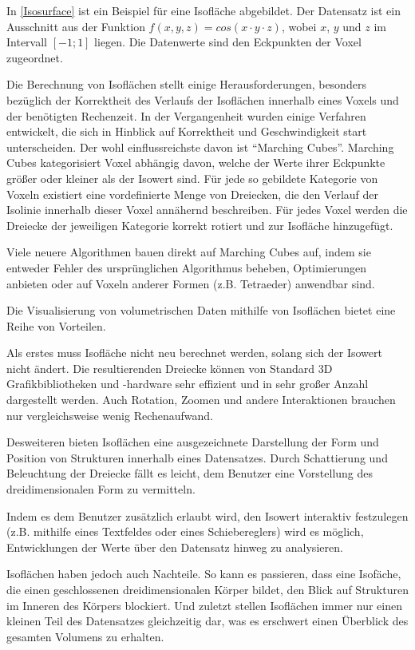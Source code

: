 \documentclass[a4paper,fontsize=12pt,toc=bib,halfparskip,ngerman]{scrartcl}
\begin{document}
In \cref{Isosurface} ist ein Beispiel f\"ur eine Isofl\"ache abgebildet. Der Datensatz ist ein Ausschnitt aus der Funktion $f(x,y,z) = cos(x \cdot y \cdot z)$, wobei $x$, $y$ und $z$ im Intervall $[-1;1]$ liegen. Die Datenwerte sind den Eckpunkten der Voxel zugeordnet. 

Die Berechnung von Isofl\"achen stellt einige Herausforderungen, besonders bez\"uglich der Korrektheit des Verlaufs der Isofl\"achen innerhalb eines Voxels und der ben\"otigten Rechenzeit. In der Vergangenheit wurden einige Verfahren entwickelt, die sich in Hinblick auf Korrektheit und Geschwindigkeit start unterscheiden. Der wohl einflussreichste davon ist ``Marching Cubes''. Marching Cubes kategorisiert Voxel abh\"angig davon, welche der Werte ihrer Eckpunkte gr\"o{\ss}er oder kleiner als der Isowert sind. F\"ur jede so gebildete Kategorie von Voxeln existiert eine vordefinierte Menge von Dreiecken, die den Verlauf der Isolinie innerhalb dieser Voxel ann\"ahernd beschreiben. F\"ur jedes Voxel werden die Dreiecke der jeweiligen Kategorie korrekt rotiert und zur Isofl\"ache hinzugef\"ugt.

Viele neuere Algorithmen bauen direkt auf Marching Cubes auf, indem sie entweder Fehler des urspr\"unglichen Algorithmus beheben, Optimierungen anbieten oder auf Voxeln anderer Formen (z.B. Tetraeder) anwendbar sind.

Die Visualisierung von volumetrischen Daten mithilfe von Isofl\"achen bietet eine Reihe von Vorteilen. 

Als erstes muss Isofl\"ache nicht neu berechnet werden, solang sich der Isowert nicht \"andert. Die resultierenden Dreiecke k\"onnen von Standard 3D Grafikbibliotheken und -hardware sehr effizient und in sehr gro{\ss}er Anzahl dargestellt werden. Auch Rotation, Zoomen und andere Interaktionen brauchen nur vergleichsweise wenig Rechenaufwand.

Desweiteren bieten Isofl\"achen eine ausgezeichnete Darstellung der Form und Position von Strukturen innerhalb eines Datensatzes. Durch Schattierung und Beleuchtung der Dreiecke f\"allt es leicht, dem Benutzer eine Vorstellung des dreidimensionalen Form zu vermitteln.

Indem es dem Benutzer zus\"atzlich erlaubt wird, den Isowert interaktiv festzulegen (z.B. mithilfe eines Textfeldes oder eines Schiebereglers) wird es m\"oglich, Entwicklungen der Werte \"uber den Datensatz hinweg zu analysieren.

Isofl\"achen haben jedoch auch Nachteile. So kann es passieren, dass eine Isof\"ache, die einen geschlossenen dreidimensionalen K\"orper bildet, den Blick auf Strukturen im Inneren des K\"orpers blockiert. Und zuletzt stellen Isofl\"achen immer nur einen kleinen Teil des Datensatzes gleichzeitig dar, was es erschwert einen \"Uberblick des gesamten Volumens zu erhalten.
\end{document}
